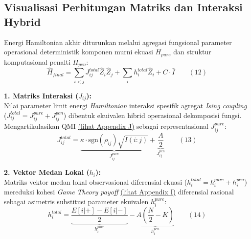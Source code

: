 \subsection{Visualisasi Perhitungan Matriks dan Interaksi Hybrid}
Energi Hamiltonian akhir diturunkan melalui agregasi fungsional parameter operasional deterministik komponen murni ekuasi $H_{pure}$ dan struktur komputasional penalti $H_{pen}$:
\[ \hat{H}_{final} = \sum_{i<j} J_{ij}^{total} \hat{Z}_i \hat{Z}_j + \sum_i h_i^{total} \hat{Z}_i + C \cdot \hat{I} \qquad (12) \]

\textbf{1. Matriks Interaksi (\(J_{ij}\)):} \\
Nilai parameter limit energi \emph{Hamiltonian} interaksi spesifik agregat \emph{Ising coupling} (\(J_{ij}^{total} = J_{ij}^{pure} + J_{ij}^{pen}\)) dibentuk ekuivalen hibrid operasional dekomposisi fungsi. Mengartikulasikan QMI \hyperref[appendix-j]{(lihat Appendix J)} sebagai representasional $J_{ij}^{pure}$:
\[ J_{ij}^{total} = \underbrace{\kappa \cdot \text{sgn}(\rho_{ij}) \sqrt{I(i:j)}}_{J_{ij}^{pure}} + \underbrace{\frac{A}{2}}_{J_{ij}^{pen}} \qquad (13) \]

\textbf{2. Vektor Medan Lokal (\(h_i\)):} \\
Matriks vektor medan lokal observasional diferensial ekuasi ($h_i^{total} = h_i^{pure} + h_i^{pen}$) mereduksi kohesi \emph{Game Theory payoff} \hyperref[appendix-i]{(lihat Appendix I)} diferensial rasional sebagai asimetris substitusi parameter ekuivalen $h_i^{pure}$:
\[ h_i^{total} = \underbrace{\frac{E[i|+] - E[i|-]}{2}}_{h_i^{pure}} - \underbrace{A\left(\frac{N}{2} - K\right)}_{h_i^{pen}} \qquad (14) \]



